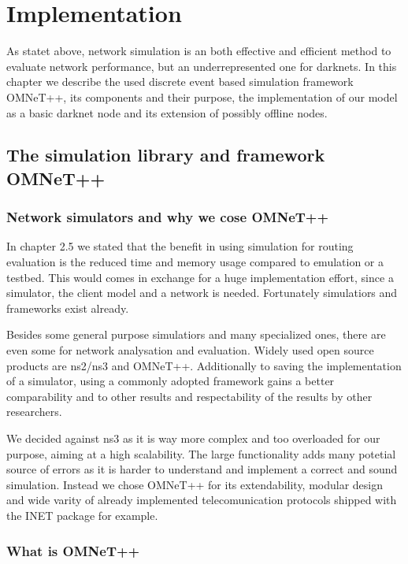 \chapter{Implementation}

As statet above, network simulation is an both effective and efficient method to evaluate network performance, but an underrepresented one for darknets. In this chapter we describe the used discrete event based simulation framework OMNeT++, its components and their purpose, the implementation of our model as a basic darknet node and its extension of possibly offline nodes.

\section{The simulation library and framework OMNeT++}

\subsection{Network simulators and why we cose OMNeT++}

In chapter 2.5 we stated that the benefit in using simulation for routing evaluation is the reduced time and memory usage compared to emulation or a testbed. This would comes in exchange for a huge implementation effort, since a simulator, the client model and a network is needed. Fortunately simulatiors and frameworks exist already.

Besides some general purpose simulatiors and many specialized ones, there are even some for network analysation and evaluation. Widely used open source products are ns2/ns3 and OMNeT++. Additionally to saving the implementation of a simulator, using a commonly adopted framework gains a better comparability and to other results and respectability of the results by other researchers.

We decided against ns3 as it is way more complex and too overloaded for our purpose, aiming at a high scalability. The large functionality adds many potetial source of errors as it is harder to understand and implement a correct and sound simulation. Instead we chose OMNeT++ for its extendability, modular design and wide varity of already implemented telecomunication protocols shipped with the INET package for example.

\subsection{What is OMNeT++}

